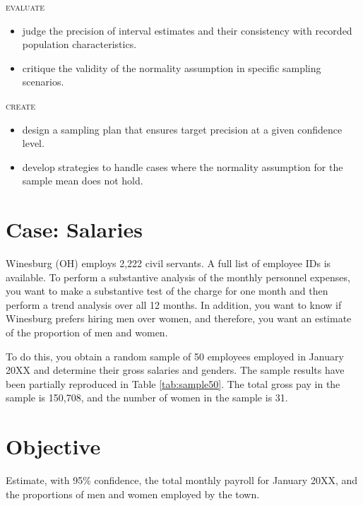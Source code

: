 \noindent \textsc{evaluate}
\begin{itemize}

\item judge the precision of interval estimates and their consistency with recorded population characteristics.
\item critique the validity of the normality assumption in specific sampling scenarios.
\end{itemize}

\noindent \textsc{create}
\begin{itemize}

\item design a sampling plan that ensures target precision at a given confidence level.
\item develop strategies to handle cases where the normality assumption for the sample mean does not hold.

\end{itemize}

\begin{mdframed}[hidealllines=true,backgroundcolor=KPMG_blue!10,innerbottommargin=0cm, innerleftmargin=0.3cm]
\sloppy
\section*{Case: Salaries}
Winesburg (OH) employs 2,222 civil servants. A full list of employee IDs is available. To perform a substantive analysis of the monthly personnel expenses, you want to make a substantive test of the charge for one month and then perform a trend analysis over all 12 months. In addition, you want to know if Winesburg prefers hiring men over women, and therefore, you want an estimate of the proportion of men and women.

To do this, you obtain a random sample of 50 employees employed in January 20XX and determine their gross salaries and genders. The sample results have been partially reproduced in Table \ref{tab:sample50}. The total gross pay in the sample is 150,708, and the number of women in the sample is 31. 

\section*{Objective}
Estimate, with 95\% confidence, the total monthly payroll for January 20XX, and the proportions of men and women employed by the town.

\vspace{\baselineskip}
\end{mdframed}

